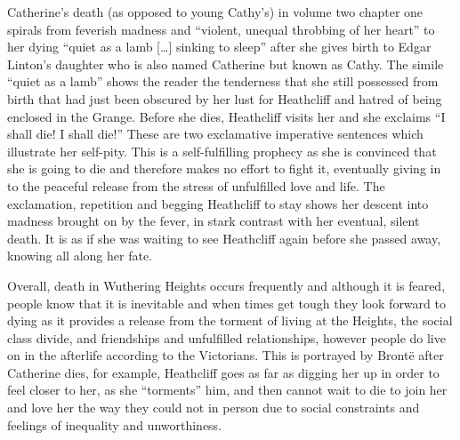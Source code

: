 \documentclass[a4paper,12pt]{article}
\begin{document}
Catherine's death (as opposed to young Cathy's) in volume two chapter one spirals from feverish madness and ``violent, unequal throbbing of her heart'' to her dying ``quiet as a lamb [\ldots] sinking to sleep'' after she gives birth to Edgar Linton's daughter who is also named Catherine but known as Cathy. The simile ``quiet as a lamb'' shows the reader the tenderness that she still possessed from birth that had just been obscured by her lust for Heathcliff and hatred of being enclosed in the Grange. Before she dies, Heathcliff visits her and she exclaims ``I shall die! I shall die!'' These are two exclamative imperative sentences which illustrate her self-pity. This is a self-fulfilling prophecy as she is convinced that she is going to die and therefore makes no effort to fight it, eventually giving in to the peaceful release from the stress of unfulfilled love and life. The exclamation, repetition and begging Heathcliff to stay shows her descent into madness brought on by the fever, in stark contrast with her eventual, silent death. It is as if she was waiting to see Heathcliff again before she passed away, knowing all along her fate.

Overall, death in Wuthering Heights occurs frequently and although it is feared, people know that it is inevitable and when times get tough they look forward to dying as it provides a release from the torment of living at the Heights, the social class divide, and friendships and unfulfilled relationships, however people do live on in the afterlife according to the Victorians. This is portrayed by Bront\"{e} after Catherine dies, for example, Heathcliff goes as far as digging her up in order to feel closer to her, as she ``torments'' him, and then cannot wait to die to join her and love her the way they could not in person due to social constraints and feelings of inequality and unworthiness.
\end{document}
